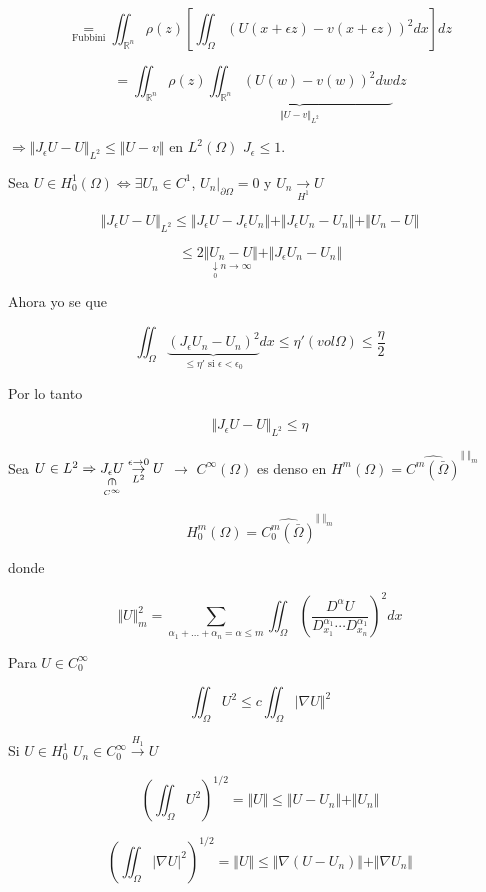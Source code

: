 \documentclass[a4paper,10pt]{book}
\def \ep{\epsilon}
\newcommand{\rotin}{\mathbin{\rotatebox[origin=c]{270}{$\in$}}}
\begin{document}
\[
\underset{\text{Fubbini}}{=} \iint_{\mathbb{R}^n} \rho (z) \left[  \iint_\Omega \left( U(x+\ep z) -v(x+\ep z) \right)^2 dx \right] dz 
\]

\[
=\iint_{\mathbb{R}^n} \rho(z) \underset{ \Vert U-v\Vert_{L^2}}{ \underbrace{ \iint_{\mathbb{R}^n} \left( U(w) -v(w)  \right)^2 dw  } } dz 
\]

$\Rightarrow \Vert J_\ep U -U\Vert_{L^2} \leq \Vert U-v\Vert $ en $L^2(\Omega) $  $J_\ep \leq 1$.

Sea $U \in H_0^1 (\Omega) \Leftrightarrow \exists U_n \in C^1$, $U_n|_{\partial \Omega} =0 $ y $U_n\underset{H^1}{\rightarrow}U$ 

\[
\Vert J_\ep U- U\Vert_{L^2} \leq \Vert J_\ep U -J_\ep U_n\Vert + \Vert J_\ep U_n -U_n\Vert + \Vert U_n-U\Vert
\]

\[
\leq 2 \underset{{\underset{0} {\downarrow} n\rightarrow \infty}}{\Vert U_n -U\Vert } + \Vert J_\ep U_n-U_n\Vert
\]

Ahora yo se que 

\[
\iint_\Omega \underset{\leq \eta' \text{ si } \ep< \ep_0 }{\underbrace {\left( J_\ep U_n -U_n\right)^2} }  dx \leq \eta' (vol \Omega )\leq \frac{\eta}{2}
\]

Por lo tanto

\[
\Vert J_\ep U - U \Vert_{L^2} \leq \eta
\]

Sea $U\in L^2 \Rightarrow \underset{\underset{C^\infty}{\rotin}}{J_\ep U} \underset{L^2}{\overset{\ep \rightarrow 0}{\rightarrow }}  U$ $\rightarrow$ $C^\infty (\Omega) $ es denso en $H^m(\Omega) = \widehat{C^m(\bar{\Omega})} ^{\Vert\;\Vert_m}$

\[
H_0^m(\Omega) = \widehat{C_0^m(\bar{\Omega})} ^{\Vert\;\Vert_m}
\]

donde

\[
\Vert U\Vert_m^2 = \sum\limits_{\alpha_1+...+\alpha_n = \alpha \leq m} \iint_\Omega \left( \frac{D^\alpha U }{D^{\alpha_1}_{x_1} \cdots D^{\alpha_1}_{x_n}  } \right)^2 dx
\]

Para $U\in C_0^\infty $

\[
\iint_\Omega U^2 \leq c\iint_\Omega |\nabla U\Vert^2
\]

Si $U\in H_0^1$ $U_n\in C_0^\infty \overset{H_1}{\rightarrow} U$

\[
\left( \iint_\Omega U^2 \right)^{1/2}= \Vert U\Vert \leq \Vert U -U_n\Vert + \Vert U_n\Vert
\]

\[
\left( \iint_\Omega |\nabla U|^2 \right)^{1/2}= \Vert U\Vert \leq \Vert  \nabla (U -U_n) \Vert + \Vert \nabla U_n\Vert
\]
\end{document}
